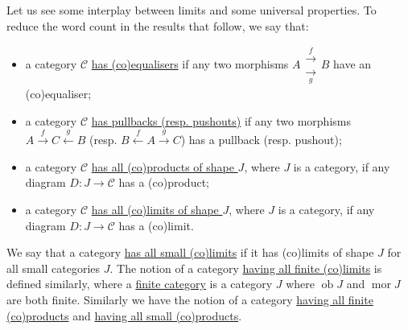 \documentclass[a4paper,11pt]{article}
\theoremstyle{break_italics}
\theoremstyle{break_upright}
\theoremstyle{remark}
\newcommand{\ob}{\operatorname{ob}}
\newcommand{\mor}{\operatorname{mor}}
\newcommand{\C}{\mathcal{C}}
\begin{document}
Let us see some interplay between limits and some universal properties. To reduce the word count in the results that follow, we say that:
\begin{itemize}
	\item a category $\C$ \uline{has (co)equalisers} if any two morphisms $A \substack{\xrightarrow{f} \\ \xrightarrow[g]{}} B$ have an (co)equaliser;
	\item a category $\C$ \uline{has pullbacks (resp. pushouts)} if any two morphisms $A \xrightarrow{f} C \xleftarrow{g} B$ (resp. $B \xleftarrow{f} A \xrightarrow{g} C$) has a pullback (resp. pushout);
	\item a category $\C$ \uline{has all (co)products of shape $J$}, where $J$ is a category, if any diagram $D \colon J \to \C$ has a (co)product;
	\item a category $\C$ \uline{has all (co)limits of shape $J$}, where $J$ is a category, if any diagram $D \colon J \to \C$ has a (co)limit.
\end{itemize}
We say that a category \uline{has all small (co)limits} if it has (co)limits of shape $J$ for all small categories $J$. The notion of a category \uline{having all finite (co)limits} is defined similarly, where a \uline{finite category} is a category $J$ where $\ob J$ and $\mor J$ are both finite. Similarly we have the notion of a category \uline{having all finite (co)products} and \uline{having all small (co)products}.
\end{document}
